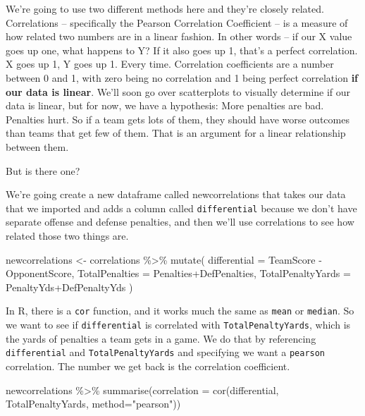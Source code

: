 \documentclass[
]{book}
\newenvironment{Shaded}{\begin{snugshade}}{\end{snugshade}}
\newcommand{\AttributeTok}[1]{\textcolor[rgb]{0.77,0.63,0.00}{#1}}
\newcommand{\FunctionTok}[1]{\textcolor[rgb]{0.00,0.00,0.00}{#1}}
\newcommand{\NormalTok}[1]{#1}
\newcommand{\OtherTok}[1]{\textcolor[rgb]{0.56,0.35,0.01}{#1}}
\newcommand{\SpecialCharTok}[1]{\textcolor[rgb]{0.00,0.00,0.00}{#1}}
\newcommand{\StringTok}[1]{\textcolor[rgb]{0.31,0.60,0.02}{#1}}
\begin{document}
We're going to use two different methods here and they're closely related. Correlations -- specifically the Pearson Correlation Coefficient -- is a measure of how related two numbers are in a linear fashion. In other words -- if our X value goes up one, what happens to Y? If it also goes up 1, that's a perfect correlation. X goes up 1, Y goes up 1. Every time. Correlation coefficients are a number between 0 and 1, with zero being no correlation and 1 being perfect correlation \textbf{if our data is linear}. We'll soon go over scatterplots to visually determine if our data is linear, but for now, we have a hypothesis: More penalties are bad. Penalties hurt. So if a team gets lots of them, they should have worse outcomes than teams that get few of them. That is an argument for a linear relationship between them.

But is there one?

We're going create a new dataframe called newcorrelations that takes our data that we imported and adds a column called \texttt{differential} because we don't have separate offense and defense penalties, and then we'll use correlations to see how related those two things are.

\begin{Shaded}
\begin{Highlighting}[]
\NormalTok{newcorrelations }\OtherTok{\textless{}{-}}\NormalTok{ correlations }\SpecialCharTok{\%\textgreater{}\%} 
  \FunctionTok{mutate}\NormalTok{(}
    \AttributeTok{differential =}\NormalTok{ TeamScore }\SpecialCharTok{{-}}\NormalTok{ OpponentScore, }
    \AttributeTok{TotalPenalties =}\NormalTok{ Penalties}\SpecialCharTok{+}\NormalTok{DefPenalties, }
    \AttributeTok{TotalPenaltyYards =}\NormalTok{ PenaltyYds}\SpecialCharTok{+}\NormalTok{DefPenaltyYds}
\NormalTok{    )}
\end{Highlighting}
\end{Shaded}

In R, there is a \texttt{cor} function, and it works much the same as \texttt{mean} or \texttt{median}. So we want to see if \texttt{differential} is correlated with \texttt{TotalPenaltyYards}, which is the yards of penalties a team gets in a game. We do that by referencing \texttt{differential} and \texttt{TotalPenaltyYards} and specifying we want a \texttt{pearson} correlation. The number we get back is the correlation coefficient.

\begin{Shaded}
\begin{Highlighting}[]
\NormalTok{newcorrelations }\SpecialCharTok{\%\textgreater{}\%} \FunctionTok{summarise}\NormalTok{(}\AttributeTok{correlation =} \FunctionTok{cor}\NormalTok{(differential, TotalPenaltyYards, }\AttributeTok{method=}\StringTok{"pearson"}\NormalTok{))}
\end{Highlighting}
\end{Shaded}
\end{document}
